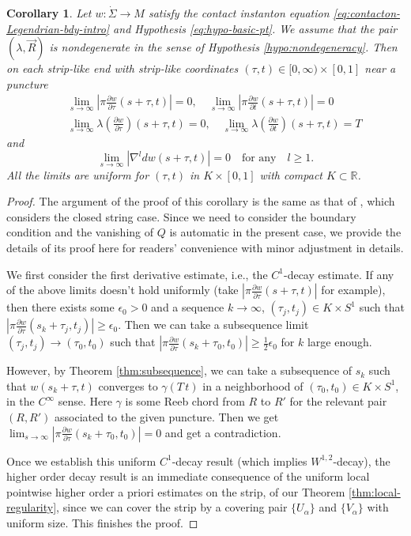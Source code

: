 \documentclass[reqno]{amsart}
\def\R{\ifmmode{\mathbb R}\else{$\mathbb R$}\fi} %
\newcommand{\del}{\partial}
\newcommand{\beastar}{\begin{eqnarray*}}
\newcommand{\eeastar}{\end{eqnarray*}}
\theoremstyle{theorem}
\newtheorem{cor}[thm]{Corollary}
\theoremstyle{definition}
\numberwithin{equation}{section}
\def\R{{\mathbb R}}
\def\R{{\mathbb R}}
\def\R{\ifmmode{\mathbb R}\else{$\mathbb R$}\fi} %
\def\R{{\mathbb R}}
\def\R{{\mathbb R}}
\begin{document}
\begin{cor}\label{cor:tangent-convergence} Let $w: \dot \Sigma \to M$ satisfy the contact instanton equation \eqref{eq:contacton-Legendrian-bdy-intro} and Hypothesis \eqref{eq:hypo-basic-pt}.
We assume that the pair $(\lambda, \vec R)$ is nondegenerate
in the sense of Hypothesis \ref{hypo:nondegeneracy}.
Then on each strip-like end with strip-like coordinates $(\tau,t) \in [0,\infty) \times [0,1]$ near a puncture
\beastar
&&\lim_{s\to \infty}\left|\pi \frac{\del w}{\del\tau}(s+\tau, t)\right|=0, \quad
\lim_{s\to \infty}\left|\pi \frac{\del w}{\del t}(s+\tau, t)\right|=0\\
&&\lim_{s\to \infty}\lambda(\frac{\del w}{\del\tau})(s+\tau, t)=0, \quad
\lim_{s\to \infty}\lambda(\frac{\del w}{\del t})(s+\tau, t)=T
\eeastar
and
$$
\lim_{s\to \infty}|\nabla^l dw(s+\tau, t)|=0 \quad \text{for any}\quad l\geq 1.
$$
All the limits are uniform for $(\tau, t)$ in $K\times [0,1]$ with compact $K\subset \R$.
\end{cor}
\begin{proof} The argument of the proof of this corollary is the same as that of
\cite[Corollary 5.11]{oh-wang:CR-map1}, which considers the closed string case.
Since we need to consider the boundary condition
and the vanishing of $Q$ is automatic in the present case,
we  provide the details of its proof here  for readers' convenience with minor adjustment
in details.

We first consider the first derivative estimate, i.e., the $C^1$-decay estimate.
If any of the above limits doesn't hold uniformly (take $|\pi \frac{\del w}{\del\tau}(s+\tau, t)|$ for example),
then there exists some $\epsilon_0>0$ and a sequence
$k\to \infty$, $(\tau_j, t_j)\in K\times S^1$ such that $|\pi \frac{\del w}{\del\tau}(s_k+\tau_j, t_j)|\geq \epsilon_0$.
Then we can take a subsequence limit $(\tau_j, t_j)\to (\tau_0, t_0)$ such that
$|\pi \frac{\del w}{\del\tau}(s_k+\tau_0, t_0)|\geq \frac{1}{2}\epsilon_0$ for $k$ large enough.

However, by Theorem \ref{thm:subsequence}, we can take a subsequence of $s_k$ such that
$w(s_k+\tau, t)$ converges to $\gamma(T\, t)$ in a neighborhood of $(\tau_0, t_0)\in K\times S^1$,
in the $C^\infty$ sense. Here $\gamma$ is some Reeb chord from $R$ to $R'$ for the
relevant pair $(R,R')$ associated to the given puncture.
Then we get $\lim_{s\to \infty}|\pi \frac{\del w}{\del\tau}(s_k+\tau_0, t_0)|=0$ and get a contradiction.

Once we establish this uniform $C^1$-decay result (which implies $W^{1,2}$-decay),
the higher order decay result is
an immediate consequence of the uniform local pointwise higher order
a priori estimates on the strip, of our Theorem \ref{thm:local-regularity}, since we can
cover the strip by a covering pair $\{U_\alpha\}$ and $\{V_\alpha\}$ with uniform size.
This finishes the proof.
\end{proof}
\end{document}
